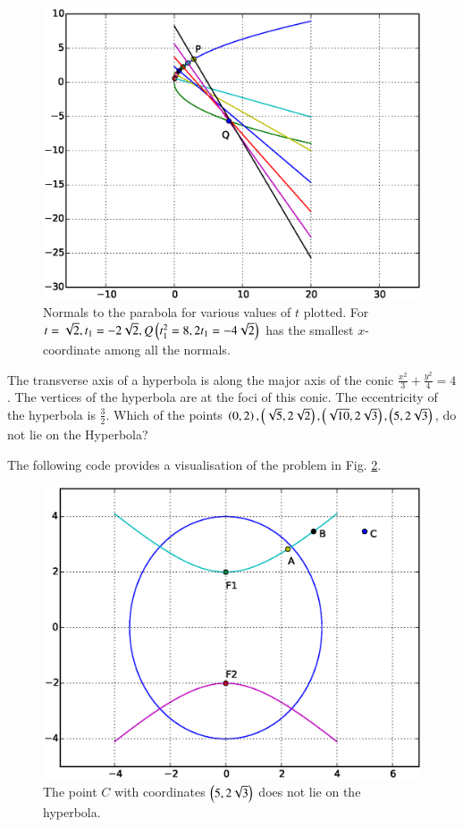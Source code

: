\documentclass[journal,12pt,twocolumn]{IEEEtran}
\begin{document}
\begin{figure}[h]
\centering
\includegraphics[width=\columnwidth]{./figs/ee16b1023}
\caption{ Normals to the parabola for various values of $t$ plotted.  For $t = \sqrt{2}, t_1 = -2\sqrt{2}, Q\left(t_1^2 = 8, 2t_1 = -4\sqrt{2}\right)$ has the smallest $x$-coordinate   among all the normals.}
\label{fig_23}	
\end{figure}
%
\begin{problem}
The transverse axis of a hyperbola is along the major axis of the conic $\frac{x^2}{3}+ \frac{y^2}{4} = 4$. The vertices of the hyperbola are at the foci of this conic. The eccentricity of the hyperbola is $\frac{3}{2}$. Which of the points $\left(0,2\right),\left(\sqrt{5},2\sqrt{2}\right),\left(\sqrt{10},2\sqrt{3}\right),\left(5, 2\sqrt{3}\right)$, do not lie on the Hyperbola?
\end{problem}
\solution

The following code provides a visualisation of the problem in Fig. \ref{fig_24}.

%
\begin{figure}[h]
\centering
\includegraphics[width=\columnwidth]{./figs/ee16b1024}
\caption{ The point $C$ with coordinates $\left(5, 2\sqrt{3}\right)$ does not lie on the hyperbola.}
\label{fig_24}	
\end{figure}
%
\end{document}
